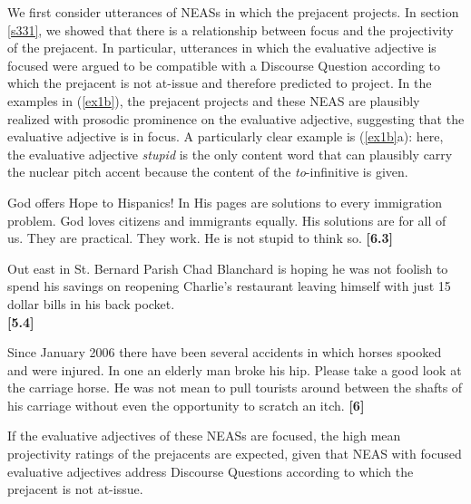 \documentclass[11pt,fleqn]{article}
\newcommand{\6}{\mbox{$[\hspace*{-.6mm}[$}}
\newcommand{\9}{\mbox{$]\hspace*{-.6mm}]$}}
\begin{document}
We first consider utterances of NEASs in which the prejacent projects. In section \ref{s331}, we showed that there is a relationship between focus and the projectivity of the prejacent. In particular, utterances in which the evaluative adjective is focused were argued to be compatible with a Discourse Question according to which the prejacent is not at-issue and therefore predicted to project. In the examples in (\ref{ex1b}), the prejacent projects and these NEAS are plausibly realized with prosodic prominence on the evaluative adjective, suggesting that the evaluative adjective is in focus. A particularly clear example is (\ref{ex1b}a): here, the evaluative adjective {\em stupid} is the only content word that can plausibly carry the nuclear pitch accent because the content of the {\em to}-infinitive is given.

\begin{exe}
\ex\label{ex1b}
\begin{xlist}

\ex God offers Hope to Hispanics! In His pages are solutions to every
immigration problem. God loves citizens and immigrants equally. His
solutions are for all of us. They are practical. They work. He is not
stupid to think so. \hfill {\bf [6.3]}

\ex Out east in St. Bernard Parish  Chad Blanchard is hoping he was not
foolish to spend his savings on reopening Charlie's restaurant
leaving himself with just 15 dollar bills in his back pocket. \\ \hspace*{.2cm} \hfill
{\bf [5.4]}




\ex Since January 2006  there have been several accidents in which
horses spooked and were injured. In one an elderly man broke his hip.
Please take a good look at the carriage horse. He was not mean
to pull tourists around between the shafts of his carriage without even
the opportunity to scratch an itch. \hfill {\bf [6]}



\end{xlist}
\end{exe} 
If the evaluative adjectives of these NEASs are focused, the high mean projectivity ratings of the prejacents are expected, given that NEAS with focused evaluative adjectives address Discourse Questions according to which the prejacent is not at-issue.
\end{document}

